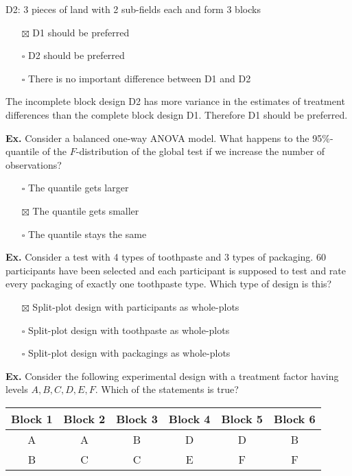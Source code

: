 D2: 3 pieces of land with 2 sub-fields each and form 3 blocks
\begin{itemize}
	\item[$\boxtimes$] D1 should be preferred
	\item[$\square$] D2 should be preferred
	\item[$\square$] There is no important difference between D1 and D2
\end{itemize}
The incomplete block design D2 has more variance in the estimates of treatment differences than the complete block design D1. Therefore D1 should be preferred.


\hrulefill

\textbf{Ex.} Consider a balanced one-way ANOVA model. What happens to the 95\%-quantile of the $F$-distribution of the global test if we increase the number of observations?
\begin{itemize}
	\item[$\square$] The quantile gets larger
	\item[$\boxtimes$] The quantile gets smaller
	\item[$\square$] The quantile stays the same
\end{itemize}


\hrulefill

\textbf{Ex.} Consider a test with 4 types of toothpaste and 3 types of packaging. 60 participants have been selected and each participant is supposed to test and rate every packaging of exactly one toothpaste type. Which type of design is this?
\begin{itemize}
	\item[$\boxtimes$] Split-plot design with participants as whole-plots
	\item[$\square$] Split-plot design with toothpaste as whole-plots
	\item[$\square$] Split-plot design with packagings as whole-plots
\end{itemize}


\hrulefill

\textbf{Ex.} Consider the following experimental design with a treatment factor having levels $A, B, C, D, E, F$. Which of the statements is true?
\begin{center}
	\begin{tabular}{c | c  | c | c | c | c}
		 Block 1 & Block 2 & Block 3 & Block 4 & Block 5 & Block 6\\ \hline
		 A & A & B & D & D & B \\
		 B & C & C & E & F & F
	\end{tabular}
\end{center}

